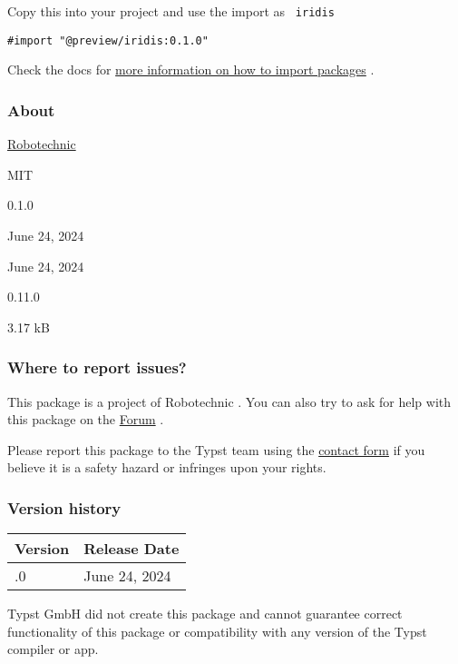 Copy this into your project and use the import as \texttt{\ iridis\ }

\begin{verbatim}
#import "@preview/iridis:0.1.0"
\end{verbatim}



Check the docs for
\href{https://typst.app/docs/reference/scripting/\#packages}{more
information on how to import packages} .

\subsubsection{About}\label{about}

\begin{description}
\tightlist
\item[Author :]
\href{https://github.com/Robotechnic}{Robotechnic}
\item[License:]
MIT
\item[Current version:]
0.1.0
\item[Last updated:]
June 24, 2024
\item[First released:]
June 24, 2024
\item[Minimum Typst version:]
0.11.0
\item[Archive size:]
3.17 kB
\href{https://packages.typst.org/preview/iridis-0.1.0.tar.gz}{\pandocbounded{}}
\end{description}

\subsubsection{Where to report issues?}\label{where-to-report-issues}

This package is a project of Robotechnic . You can also try to ask for
help with this package on the \href{https://forum.typst.app}{Forum} .

Please report this package to the Typst team using the
\href{https://typst.app/contact}{contact form} if you believe it is a
safety hazard or infringes upon your rights.

\label{versions}
\subsubsection{Version history}\label{version-history}

\begin{longtable}[]{@{}ll@{}}
\toprule\noalign{}
Version & Release Date \\
\midrule\noalign{}
\endhead
\bottomrule\noalign{}
\endlastfoot
0.1.0 & June 24, 2024 \\
\end{longtable}

Typst GmbH did not create this package and cannot guarantee correct
functionality of this package or compatibility with any version of the
Typst compiler or app.
